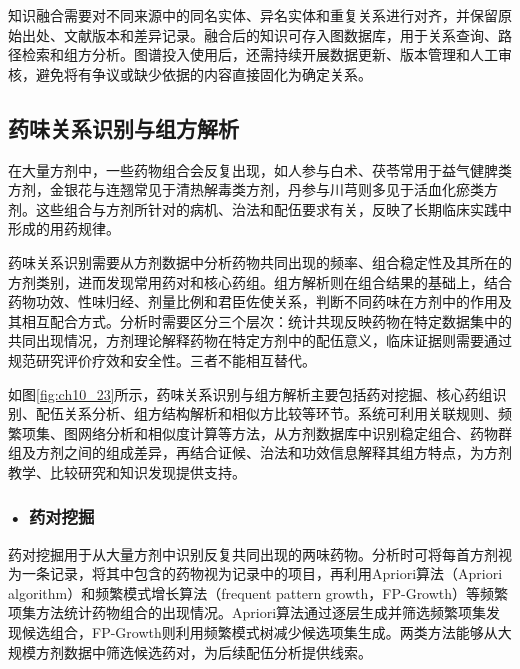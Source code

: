 知识融合需要对不同来源中的同名实体、异名实体和重复关系进行对齐，并保留原始出处、文献版本和差异记录。融合后的知识可存入图数据库，用于关系查询、路径检索和组方分析。图谱投入使用后，还需持续开展数据更新、版本管理和人工审核，避免将有争议或缺少依据的内容直接固化为确定关系。

\subsection{药味关系识别与组方解析}

在大量方剂中，一些药物组合会反复出现，如人参与白术、茯苓常用于益气健脾类方剂，金银花与连翘常见于清热解毒类方剂，丹参与川芎则多见于活血化瘀类方剂。这些组合与方剂所针对的病机、治法和配伍要求有关，反映了长期临床实践中形成的用药规律。

药味关系识别需要从方剂数据中分析药物共同出现的频率、组合稳定性及其所在的方剂类别，进而发现常用药对和核心药组。组方解析则在组合结果的基础上，结合药物功效、性味归经、剂量比例和君臣佐使关系，判断不同药味在方剂中的作用及其相互配合方式。分析时需要区分三个层次：统计共现反映药物在特定数据集中的共同出现情况，方剂理论解释药物在特定方剂中的配伍意义，临床证据则需要通过规范研究评价疗效和安全性。三者不能相互替代。

如图\ref{fig:ch10_23}所示，药味关系识别与组方解析主要包括药对挖掘、核心药组识别、配伍关系分析、组方结构解析和相似方比较等环节。系统可利用关联规则、频繁项集、图网络分析和相似度计算等方法，从方剂数据库中识别稳定组合、药物群组及方剂之间的组成差异，再结合证候、治法和功效信息解释其组方特点，为方剂教学、比较研究和知识发现提供支持。


\par
\noindent\begin{minipage}{\textwidth}
\centering
{}
\label{fig:ch10_23}
\end{minipage}
\par

\subsubsection*{\textbf{• 药对挖掘}}

药对挖掘用于从大量方剂中识别反复共同出现的两味药物。分析时可将每首方剂视为一条记录，将其中包含的药物视为记录中的项目，再利用Apriori算法（Apriori algorithm）和频繁模式增长算法（frequent pattern growth，FP-Growth）等频繁项集方法统计药物组合的出现情况。Apriori算法通过逐层生成并筛选频繁项集发现候选组合，FP-Growth则利用频繁模式树减少候选项集生成。两类方法能够从大规模方剂数据中筛选候选药对，为后续配伍分析提供线索。

